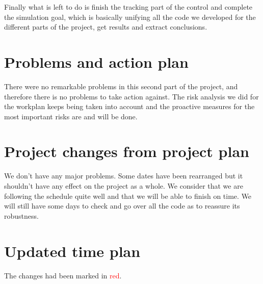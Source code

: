\documentclass{article}
\begin{document}
Finally what is left to do is finish the tracking part of the control and complete the simulation goal, which is basically unifying all the code we developed for the different parts of the project, get results and extract conclusions. 


\section{Problems and action plan}

There were no remarkable problems in this second part of the project, and therefore there is no problems to take action against. The risk analysis we did for the workplan keeps being taken into account and the proactive measures for the most important risks are and will be done.

\section{Project changes from project plan}
We don't have any major problems. Some dates have been rearranged but it shouldn't have any effect on the project as a whole. We consider that we are following the schedule quite well and that we will be able to finish on time.  We will still have some days to check and go over all the code as to reassure its robustness.

\newpage
\appendix
\section{Updated time plan}

The changes had been marked in \textcolor{red}{red}. \\
\end{document}
